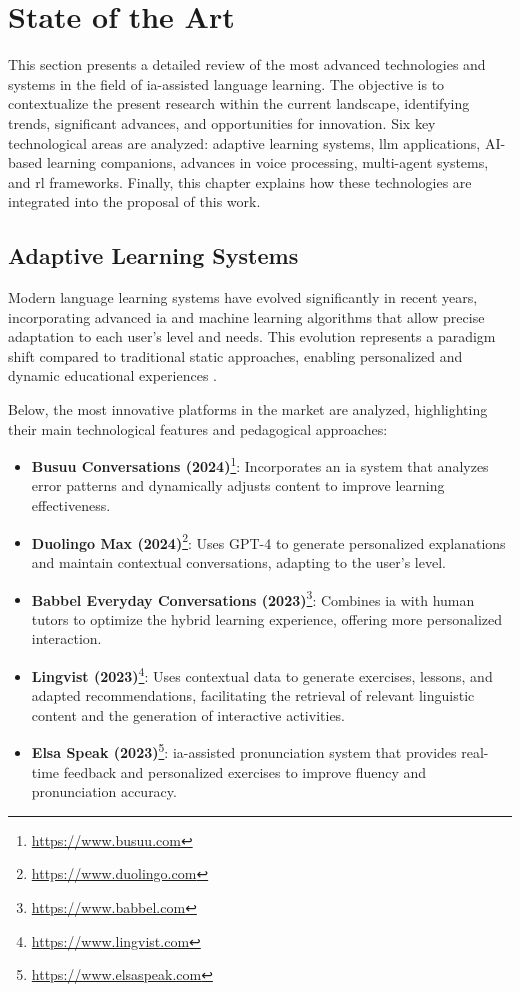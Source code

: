 \chapter{State of the Art}
\label{state-of-the-art}

This section presents a detailed review of the most advanced technologies and systems in the field of \gls{ia}-assisted language learning. The objective is to contextualize the present research within the current landscape, identifying trends, significant advances, and opportunities for innovation. Six key technological areas are analyzed: adaptive learning systems, \gls{llm} applications, AI-based learning companions, advances in voice processing, multi-agent systems, and \gls{rl} frameworks. Finally, this chapter explains how these technologies are integrated into the proposal of this work.

\section{Adaptive Learning Systems}
\label{sec:adaptive-learning-systems}


Modern language learning systems have evolved significantly in recent years, incorporating advanced \gls{ia} and machine learning algorithms that allow precise adaptation to each user's level and needs. This evolution represents a paradigm shift compared to traditional static approaches, enabling personalized and dynamic educational experiences \cite{roll2018learning}.

Below, the most innovative platforms in the market are analyzed, highlighting their main technological features and pedagogical approaches:


\begin{itemize}
  \item \textbf{Busuu Conversations (2024)}\footnote{\url{https://www.busuu.com}}: Incorporates an \gls{ia} system that analyzes error patterns and dynamically adjusts content to improve learning effectiveness.
  \item \textbf{Duolingo Max (2024)}\footnote{\url{https://www.duolingo.com}}: Uses GPT-4 to generate personalized explanations and maintain contextual conversations, adapting to the user's level.
  \item \textbf{Babbel Everyday Conversations (2023)}\footnote{\url{https://www.babbel.com}}: Combines \gls{ia} with human tutors to optimize the hybrid learning experience, offering more personalized interaction.
  \item \textbf{Lingvist (2023)}\footnote{\url{https://www.lingvist.com}}: Uses contextual data to generate exercises, lessons, and adapted recommendations, facilitating the retrieval of relevant linguistic content and the generation of interactive activities.
  \item \textbf{Elsa Speak (2023)}\footnote{\url{https://www.elsaspeak.com}}: \gls{ia}-assisted pronunciation system that provides real-time feedback and personalized exercises to improve fluency and pronunciation accuracy.
\end{itemize}

